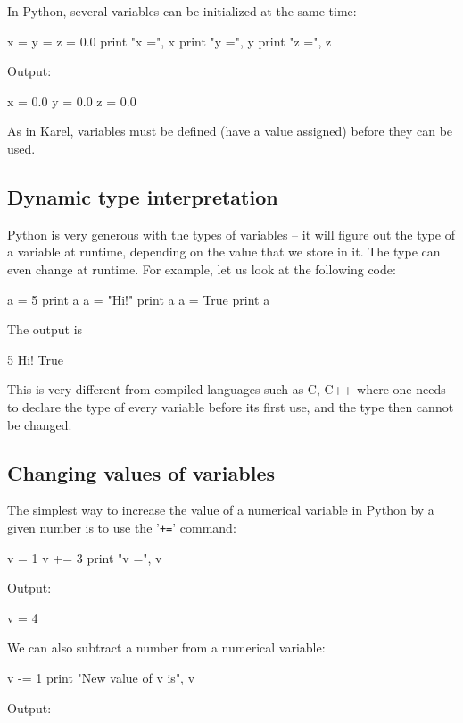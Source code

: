 In Python, several variables can be initialized at the same time:

\begin{bluecode}
x = y = z = 0.0
print "x =", x
print "y =", y
print "z =", z
\end{bluecode}
Output:

\begin{greencode}
x = 0.0
y = 0.0
z = 0.0
\end{greencode}
As in Karel, variables must be defined (have a value assigned) before they can be 
used. 

\subsection{Dynamic type interpretation}

Python is very generous with the types of variables -- it will figure out the type of a variable 
at runtime, depending on the value that we store in it. The type can even change at runtime.
For example, let us look at the following code:

\begin{bluecode}
a = 5
print a
a = "Hi!"
print a
a = True
print a
\end{bluecode}
The output is 

\begin{greencode}
5
Hi!
True
\end{greencode}
This is very different from compiled languages such as C, C++ where one needs to declare the type 
of every variable before its first use, and the type then cannot be changed. 

\subsection{Changing values of variables}

The simplest way to increase the value of a numerical variable in Python by a given number 
is to use the '{\tt +=}' command:

\begin{bluecode}
v = 1
v += 3
print "v =", v
\end{bluecode}
Output:

\begin{greencode}
v = 4
\end{greencode}
We can also subtract a number from a numerical variable:

\begin{bluecode}
v -= 1
print "New value of v is", v
\end{bluecode}
Output:

